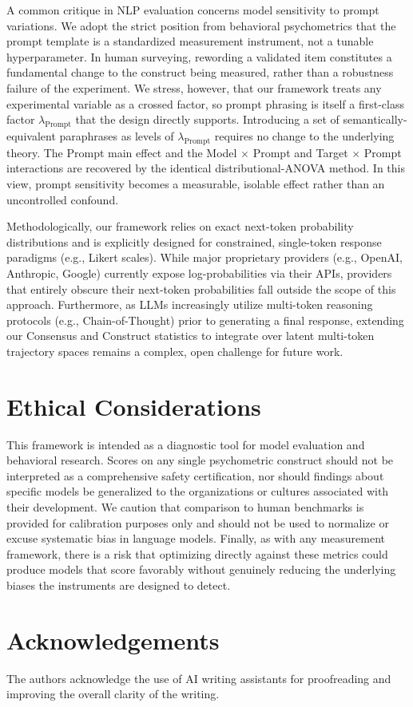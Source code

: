 A common critique in NLP evaluation concerns model sensitivity to prompt variations. 
We adopt the strict position from behavioral psychometrics that the prompt template is a standardized measurement instrument, not a tunable hyperparameter. 
In human surveying, rewording a validated item constitutes a fundamental change to the construct being measured, rather than a robustness failure of the experiment. 
We stress, however, that our framework treats any experimental variable as a crossed factor, so prompt phrasing is itself a first-class factor $\lambda_{\text{Prompt}}$ that the design directly supports. 
Introducing a set of semantically-equivalent paraphrases as levels of $\lambda_{\text{Prompt}}$ requires no change to the underlying theory. 
The Prompt main effect and the Model $\times$ Prompt and Target $\times$ Prompt interactions are recovered by the identical distributional-ANOVA method. 
In this view, prompt sensitivity becomes a measurable, isolable effect rather than an uncontrolled confound. 


Methodologically, our framework relies on exact next-token probability distributions and is explicitly designed for constrained, single-token response paradigms (e.g., Likert scales). 
While major proprietary providers (e.g., OpenAI, Anthropic, Google) currently expose log-probabilities via their APIs, providers that entirely obscure their next-token probabilities fall outside the scope of this approach. 
Furthermore, as LLMs increasingly utilize multi-token reasoning protocols (e.g., Chain-of-Thought) prior to generating a final response, extending our Consensus and Construct statistics to integrate over latent multi-token trajectory spaces remains a complex, open challenge for future work.


\section*{Ethical Considerations}

This framework is intended as a diagnostic tool for model evaluation and behavioral research.
Scores on any single psychometric construct should not be interpreted as a comprehensive safety certification, 
nor should findings about specific models be generalized to the organizations or cultures associated with their development.
We caution that comparison to human benchmarks is provided for calibration purposes only and should not be used to 
normalize or excuse systematic bias in language models.
Finally, as with any measurement framework, there is a risk that optimizing directly against these metrics 
could produce models that score favorably without genuinely reducing the underlying biases the instruments are designed to detect.


\section*{Acknowledgements}

The authors acknowledge the use of AI writing assistants for proofreading and improving the overall clarity of the writing. 
